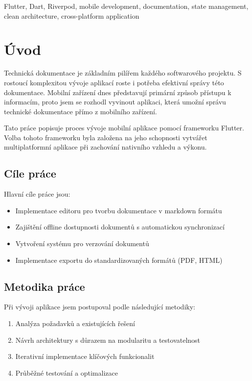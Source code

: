 \documentclass[12pt, a4paper,
twoside,        %
openright
]{report}
\begin{document}
\vspace{18pt}

\noindent Flutter, Dart, Riverpod, mobile development, documentation, state management, clean architecture, cross-platform application

\clearpage

\tableofcontents
{}
\setcounter{page}{1}

\chapter{Úvod}
\label{chap:uvod}

Technická dokumentace je základním pilířem každého softwarového projektu. S rostoucí komplexitou vývoje aplikací roste i potřeba efektivní správy této dokumentace. Mobilní zařízení dnes představují primární způsob přístupu k informacím, proto jsem se rozhodl vyvinout aplikaci, která umožní správu technické dokumentace přímo z mobilního zařízení.

Tato práce popisuje proces vývoje mobilní aplikace pomocí frameworku Flutter. Volba tohoto frameworku byla založena na jeho schopnosti vytvářet multiplatformní aplikace při zachování nativního vzhledu a výkonu.

\section{Cíle práce}
Hlavní cíle práce jsou:
\begin{itemize}
    \item Implementace editoru pro tvorbu dokumentace v markdown formátu
    \item Zajištění offline dostupnosti dokumentů s automatickou synchronizací
    \item Vytvoření systému pro verzování dokumentů
    \item Implementace exportu do standardizovaných formátů (PDF, HTML)
\end{itemize}

\section{Metodika práce}
Při vývoji aplikace jsem postupoval podle následující metodiky:
\begin{enumerate}
    \item Analýza požadavků a existujících řešení
    \item Návrh architektury s důrazem na modularitu a testovatelnost
    \item Iterativní implementace klíčových funkcionalit
    \item Průběžné testování a optimalizace
\end{enumerate}
\end{document}
